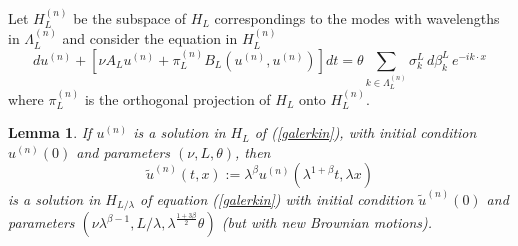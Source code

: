 \documentclass[11pt]{preprint}
\newtheorem{lemma}[theorem]{Lemma}
\begin{document}
Let $H_L^{(n)}$ be the subspace of $H_L$ correspondings to the modes
with wavelengths in $\Lambda^{(n)}_L$
and consider the equation in $H_{L}^{\left(  n\right)  }$
\begin{equation}
du^{\left(  n\right)  }+\left[  \nu A_{L}u^{\left(  n\right)  }+\pi
_{L}^{\left(  n\right)  }B_{L}\left(  u^{\left(  n\right)  },u^{\left(
n\right)  }\right)  \right]  dt=\theta\sum_{k
\in\Lambda^{(n)}_L}\sigma_k^L\,d\beta_k^L\,e^{-i k\cdot x}\label{galerkin}%
\end{equation}
where $\pi_{L}^{\left(  n\right)  }$ is the orthogonal projection of $H_{L}$
onto $H_{L}^{\left(  n\right)  }$.

\begin{lemma}
\label{appendixlemmascaling}If $u^{\left(  n\right)  }$ is a solution in
$H_{L} $ of (\ref{galerkin}), with initial condition $u^{\left(  n\right)
}\left(  0\right)  $ and parameters $\left(  \nu,L,\theta\right)  $, then
\[
\widetilde{u}^{\left(  n\right)  }(t,x):=\lambda^{\beta}u^{\left(  n\right)
}(\lambda^{1+\beta}t,\lambda x)
\]
is a solution in $H_{L/\lambda}$ of equation (\ref{galerkin}) with initial
condition $\widetilde{u}^{\left(  n\right)  }\left(  0\right)  $ and
parameters $\left(
\nu\lambda^{\beta-1},L/\lambda,\lambda^{\frac{1+3\beta}{2}}\theta\right)  $
(but with new Brownian motions).
\end{lemma}
\end{document}
